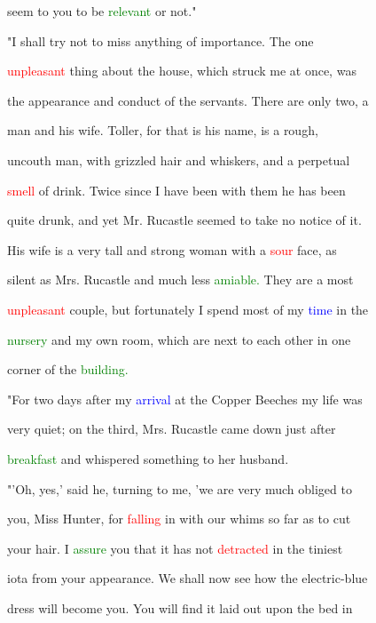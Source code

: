  seem to you to be \textcolor{green}{relevant} or not."



 "I shall try not to miss anything of \textcolor{BurntOrange}{importance.} The one

 \textcolor{red}{unpleasant} thing about the house, which struck me at once, was

 the appearance and conduct of the \textcolor{BurntOrange}{servants.} There are only two, a

 man and his wife. Toller, for that is his name, is a rough,

 uncouth man, with grizzled hair and whiskers, and a perpetual

 \textcolor{red}{smell} of drink. Twice since I have been with them he has been

 quite drunk, and yet Mr. Rucastle seemed to take no notice of it.

 His wife is a very tall and strong woman with a \textcolor{red}{sour} face, as

 silent as Mrs. Rucastle and much less \textcolor{green}{amiable.} They are a most

 \textcolor{red}{unpleasant} couple, but fortunately I spend most of my \textcolor{blue}{time} in the

 \textcolor{green}{nursery} and my own room, which are next to each other in one

 corner of the \textcolor{green}{building.}



 "For two days after my \textcolor{blue}{arrival} at the Copper Beeches my life was

 very \textcolor{BurntOrange}{quiet;} on the third, Mrs. Rucastle came down just after

 \textcolor{green}{breakfast} and whispered something to her husband.



 "'Oh, yes,' said he, turning to me, 'we are very much \textcolor{BurntOrange}{obliged} to

 you, Miss \textcolor{BurntOrange}{Hunter,} for \textcolor{red}{falling} in with our \textcolor{BurntOrange}{whims} so far as to cut

 your hair. I \textcolor{green}{assure} you that it has not \textcolor{red}{detracted} in the tiniest

 iota from your appearance. We shall now see how the electric-blue

 dress will become you. You will find it laid out upon the bed in

